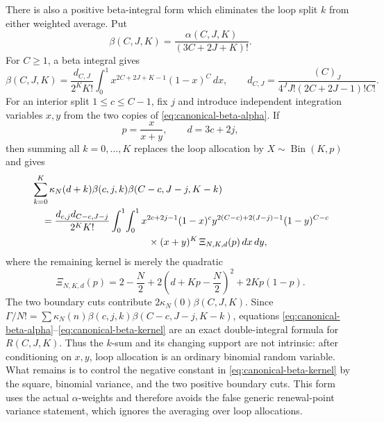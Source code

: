 \documentclass[11pt]{article}
\theoremstyle{remark}
\begin{document}
There is also a positive beta-integral form which eliminates the loop split
$k$ from either weighted average.  Put
\[
 \beta(C,J,K)=\frac{\alpha(C,J,K)}{(3C+2J+K)!}.
\]
For $C\geq1$, a beta integral gives
\begin{equation}\label{eq:canonical-beta-alpha}
 \beta(C,J,K)=\frac{d_{C,J}}{2^K K!}
 \int_0^1x^{2C+2J+K-1}(1-x)^C\,dx,
 \qquad
 d_{C,J}=\frac{(C)_J}
 {4^J J!(2C+2J-1)!C!}.
\end{equation}
For an interior split $1\leq c\leq C-1$, fix $j$ and introduce independent
integration variables $x,y$ from the two copies of
\eqref{eq:canonical-beta-alpha}.  If
\[
 p=\frac{x}{x+y},\qquad d=3c+2j,
\]
then summing all $k=0,\ldots,K$ replaces the loop allocation by
$X\sim\operatorname{Bin}(K,p)$ and gives
\begin{align}
 &\sum_{k=0}^K
 \kappa_N(d+k)\beta(c,j,k)\beta(C-c,J-j,K-k) \notag\\
 &\quad=\frac{d_{c,j}d_{C-c,J-j}}{2^K K!}
 \int_0^1\!\int_0^1
 x^{2c+2j-1}(1-x)^c
 y^{2(C-c)+2(J-j)-1}(1-y)^{C-c} \notag\\
 &\hspace{42mm}{}
 \times(x+y)^K\,\Xi_{N,K,d}(p)\,dx\,dy,
 \label{eq:canonical-beta-cut}
\end{align}
where the remaining kernel is merely the quadratic
\begin{equation}\label{eq:canonical-beta-kernel}
 \Xi_{N,K,d}(p)=2-\frac N2
 +2\left(d+Kp-\frac N2\right)^2+2Kp(1-p).
\end{equation}
The two boundary cuts contribute
$2\kappa_N(0)\beta(C,J,K)$.  Since
$\Gamma/N!=\sum\kappa_N(n)\beta(c,j,k)
\beta(C-c,J-j,K-k)$, equations
\eqref{eq:canonical-beta-alpha}--\eqref{eq:canonical-beta-kernel} are an
exact double-integral formula for $R(C,J,K)$.  Thus the $k$-sum and its
changing support are not intrinsic: after conditioning on $x,y$, loop
allocation is an ordinary binomial random variable.  What remains is to
control the negative constant in \eqref{eq:canonical-beta-kernel} by the
square, binomial variance, and the two positive boundary cuts.  This form
uses the actual $\alpha$-weights and therefore avoids the false generic
renewal-point variance statement, which ignores the averaging over loop
allocations.
\end{document}
